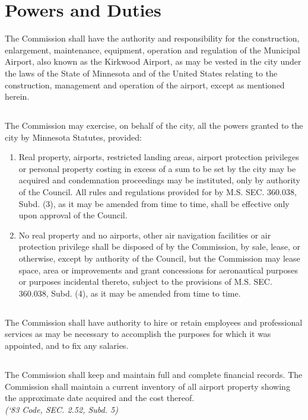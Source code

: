 \section{Powers and Duties}
The Commission shall have the authority and responsibility for the construction, enlargement, maintenance, equipment, operation and regulation of the Municipal Airport, also known as the Kirkwood Airport, as may be vested in the city under the laws of the State of Minnesota and of the United States relating to the construction, management and operation of the airport, except as mentioned herein.
\subsection{}
The Commission may exercise, on behalf of the city, all the powers granted to the city by Minnesota Statutes, provided:
\begin{enumerate}
    \item Real property, airports, restricted landing areas, airport protection privileges or personal property costing in excess of a sum to be set by the city may be acquired and condemnation proceedings may be instituted, only by authority of the Council.  All rules and regulations provided for by M.S. SEC. 360.038, Subd. (3), as it may be amended from time to time, shall be effective only upon approval of the Council.
    \item No real property and no airports, other air navigation facilities or air protection privilege shall be disposed of by the Commission, by sale, lease, or otherwise, except by authority of the Council, but the Commission may lease space, area or improvements and grant concessions for aeronautical purposes or purposes incidental thereto, subject to the provisions of M.S. SEC. 360.038, Subd. (4), as it may be amended from time to time.
\end{enumerate}
\subsection{}
The Commission shall have authority to hire or retain employees and professional services as may be necessary to accomplish the purposes for which it was appointed, and to fix any salaries.
\subsection{}
The Commission shall keep and maintain full and complete financial records.  The Commission shall maintain a current inventory of all airport property showing the approximate date acquired and the cost thereof.\\
\emph{(‘83 Code, SEC. 2.52, Subd. 5)}

